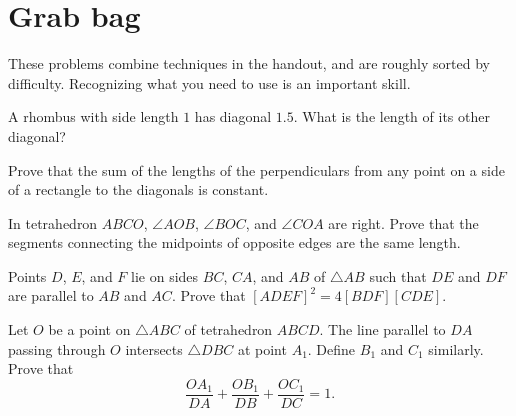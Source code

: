 \documentclass[11pt,paper=letter]{scrartcl}
\begin{document}
\section{Grab bag}

These problems combine techniques in the handout, and are roughly sorted by difficulty. Recognizing what you need to use is an important skill.

\begin{mdframed}[style=exmdbox,frametitle={Grab bag}]
  \begin{problem}
    A rhombus with side length $1$ has diagonal $1.5$. What is the length of its other diagonal? \hints{\ref{h:gb81}}
  \end{problem}

  \begin{problem}
    Prove that the sum of the lengths of the perpendiculars from any point on a side of a rectangle to the diagonals is constant. \hints{\ref{h:an42} \ref{h:gb72}} %
  \end{problem}

  \begin{problem}
    In tetrahedron $ABCO$, $\angle AOB$, $\angle BOC$, and $\angle COA$ are right. Prove that the segments connecting the midpoints of opposite edges are the same length. \hints{\ref{h:gb81} \ref{h:bf11} \ref{h:gbe3}}
  \end{problem} %

  \begin{problem}
    Points $D$, $E$, and $F$ lie on sides $BC$, $CA$, and $AB$ of $\triangle AB$ such that $DE$ and $DF$ are parallel to $AB$ and $AC$. Prove that $[ADEF]^2 = 4[BDF][CDE]$. \hint{\ref{h:rd62} \ref{h:gbx1}} %
  \end{problem}

  \begin{problem}
    Let $O$ be a point on $\triangle ABC$ of tetrahedron $ABCD$. The line parallel to $DA$ passing through $O$ intersects $\triangle DBC$ at point $A_1$. Define $B_1$ and $C_1$ similarly. Prove that $$\frac{OA_1}{DA} + \frac{OB_1}{DB} + \frac{OC_1}{DC} = 1.$$ \hints{\ref{h:dg41} \ref{h:gb62} \ref{h:gbd3}}
  \end{problem}%
\end{mdframed}
\end{document}
